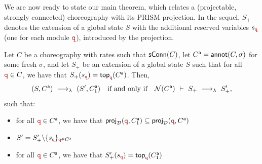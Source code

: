 We are now ready to state our main theorem, which relates a
(projectable, strongly connected) choreography with its PRISM
projection.  In the sequel, $S_+$ denotes the extension of a global
state $S$ with the additional reserved variables $s_{\nrr}$ (one for
each module $\nrr$), introduced by the projection.  
\begin{thm}[Projection]\label{thm:epp}
  Let $C$ be a choreography with rates such that $\mathsf{sConn}(C)$, let
  ${C}^{\mathsf a} = \mathsf{annot}(C,\sigma)$ for some fresh $\sigma$, and
  let $S_+$ be an extension of a global state $S$ such that for all
  $\nrr\in C$, we have that
  $S_+(s_{\nrr})=\topannotation\nrr {\anno C}$.  Then,
  \[
    (S, {C}^{\mathsf a}) \ \longrightarrow_{\lambda}\  (S', {C}^{\mathsf a}_1) \quad\text{if and only if}\quad
    \mathcal N({C}^{\mathsf a})\ \vdash\ S_+ \ \longrightarrow_{\lambda}\ 
    S_+' ,
  \]
  such that: 
  \begin{itemize}
  \item for all $\nrr\in \anno C$, we have that
    $\projD(\nrr, \anno C_1) \subseteq \projD(\nrr, \anno C)$
  \item $S'=S'_{+}\backslash \{s_{\nrr}\}_{\nrr\in \anno C}$
  \item for all $\nrr\in \anno C$, we have that
    $S_+'(s_{\nrr}) = \topannotation\nrr {\anno C_1}$
  \end{itemize}
\end{thm}
